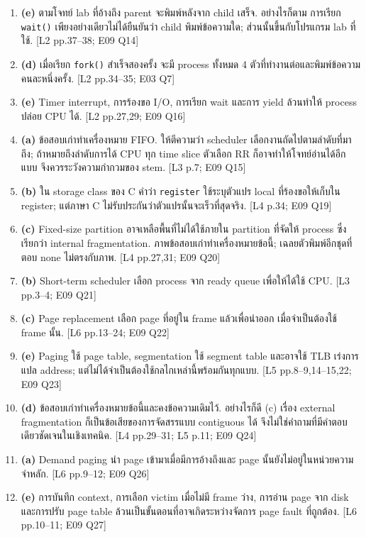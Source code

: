 \begin{enumerate}[leftmargin=1.4em,start=1,itemsep=0.14cm]
\item \textbf{(e)} ตามโจทย์ lab ที่อ้างถึง parent จะพิมพ์หลังจาก child เสร็จ. อย่างไรก็ตาม การเรียก \texttt{wait()} เพียงอย่างเดียวไม่ได้ยืนยันว่า child พิมพ์ข้อความใด; ส่วนนั้นขึ้นกับโปรแกรม lab ที่ใช้. {\small [L2 pp.37--38; E09 Q14]}
\item \textbf{(d)} เมื่อเรียก \texttt{fork()} สำเร็จสองครั้ง จะมี process ทั้งหมด 4 ตัวที่ทำงานต่อและพิมพ์ข้อความคนละหนึ่งครั้ง. {\small [L2 pp.34--35; E03 Q7]}
\item \textbf{(e)} Timer interrupt, การร้องขอ I/O, การเรียก wait และการ yield ล้วนทำให้ process ปล่อย CPU ได้. {\small [L2 pp.27,29; E09 Q16]}
\item \textbf{(a)} ข้อสอบเก่าทำเครื่องหมาย FIFO. ให้ตีความว่า scheduler เลือกงานถัดไปตามลำดับที่มาถึง; ถ้าหมายถึงลำดับการได้ CPU ทุก time slice ตัวเลือก RR ก็อาจทำให้โจทย์อ่านได้อีกแบบ จึงควรระวังความกำกวมของ stem. {\small [L3 p.7; E09 Q15]}
\item \textbf{(b)} ใน storage class ของ C คำว่า \texttt{register} ใช้ระบุตัวแปร local ที่ร้องขอให้เก็บใน register; แต่ภาษา C ไม่รับประกันว่าตัวแปรนั้นจะเร็วที่สุดจริง. {\small [L4 p.34; E09 Q19]}
\item \textbf{(c)} Fixed-size partition อาจเหลือพื้นที่ไม่ได้ใช้ภายใน partition ที่จัดให้ process ซึ่งเรียกว่า internal fragmentation. ภาพข้อสอบเก่าทำเครื่องหมายข้อนี้; เฉลยตัวพิมพ์อีกชุดที่ตอบ none ไม่ตรงกับภาพ. {\small [L4 pp.27,31; E09 Q20]}
\item \textbf{(b)} Short-term scheduler เลือก process จาก ready queue เพื่อให้ได้ใช้ CPU. {\small [L3 pp.3--4; E09 Q21]}
\item \textbf{(c)} Page replacement เลือก page ที่อยู่ใน frame แล้วเพื่อนำออก เมื่อจำเป็นต้องใช้ frame นั้น. {\small [L6 pp.13--24; E09 Q22]}
\item \textbf{(e)} Paging ใช้ page table, segmentation ใช้ segment table และอาจใช้ TLB เร่งการแปล address; แต่ไม่ได้จำเป็นต้องใช้กลไกเหล่านี้พร้อมกันทุกแบบ. {\small [L5 pp.8--9,14--15,22; E09 Q23]}
\item \textbf{(d)} ข้อสอบเก่าทำเครื่องหมายข้อนี้และคงข้อความเดิมไว้. อย่างไรก็ดี (c) เรื่อง external fragmentation ก็เป็นข้อเสียของการจัดสรรแบบ contiguous ได้ จึงไม่ใช่คำถามที่มีคำตอบเดียวชัดเจนในเชิงเทคนิค. {\small [L4 pp.29--31; L5 p.11; E09 Q24]}
\item \textbf{(a)} Demand paging นำ page เข้ามาเมื่อมีการอ้างถึงและ page นั้นยังไม่อยู่ในหน่วยความจำหลัก. {\small [L6 pp.9--12; E09 Q26]}
\item \textbf{(e)} การบันทึก context, การเลือก victim เมื่อไม่มี frame ว่าง, การอ่าน page จาก disk และการปรับ page table ล้วนเป็นขั้นตอนที่อาจเกิดระหว่างจัดการ page fault ที่ถูกต้อง. {\small [L6 pp.10--11; E09 Q27]}

\end{enumerate}
